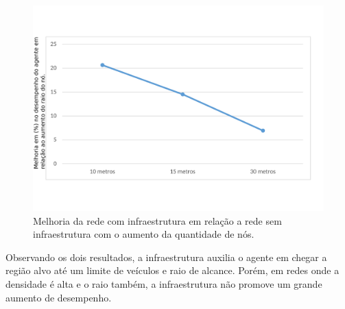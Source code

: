 \begin{figure}[htbp]
	\centering
	\includegraphics[scale=0.34]{resultados/graficos/comparacaoMelhoriaComVariacaoRaioAlcance.pdf}
	\caption{Melhoria da rede com infraestrutura em relação a rede sem infraestrutura com o aumento da quantidade de nós.}
	\label{fig:comparacaoMelhoriaComVariacaoRaioAlcance}
\end{figure}

Observando os dois resultados, a infraestrutura auxilia o agente em chegar a região alvo até um limite de veículos e raio de alcance. Porém, em redes onde a densidade é alta e o raio também, a infraestrutura não promove um grande aumento de desempenho.
